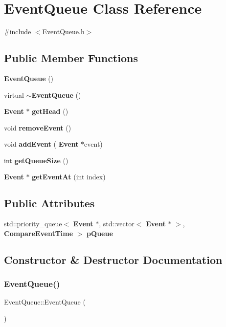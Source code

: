 \section{Event\+Queue Class Reference}
\label{classEventQueue}


{\ttfamily \#include $<$Event\+Queue.\+h$>$}

\subsection*{Public Member Functions}
\begin{DoxyCompactItemize}
\item 
\textbf{ Event\+Queue} ()
\item 
virtual \textbf{ $\sim$\+Event\+Queue} ()
\item 
\textbf{ Event} $\ast$ \textbf{ get\+Head} ()
\item 
void \textbf{ remove\+Event} ()
\item 
void \textbf{ add\+Event} (\textbf{ Event} $\ast$event)
\item 
int \textbf{ get\+Queue\+Size} ()
\item 
\textbf{ Event} $\ast$ \textbf{ get\+Event\+At} (int index)
\end{DoxyCompactItemize}
\subsection*{Public Attributes}
\begin{DoxyCompactItemize}
\item 
std\+::priority\+\_\+queue$<$ \textbf{ Event} $\ast$, std\+::vector$<$ \textbf{ Event} $\ast$ $>$, \textbf{ Compare\+Event\+Time} $>$ \textbf{ p\+Queue}
\end{DoxyCompactItemize}


\subsection{Constructor \& Destructor Documentation}
\mbox{\label{classEventQueue_ab7de5a41befc94aac0f461391e67f14a}} 
\subsubsection{Event\+Queue()}
{\footnotesize\ttfamily Event\+Queue\+::\+Event\+Queue (\begin{DoxyParamCaption}{ }\end{DoxyParamCaption})}

